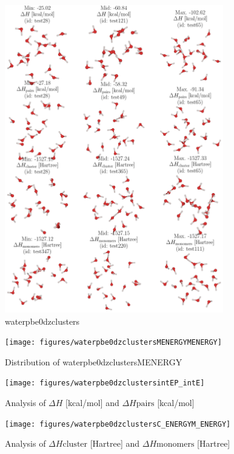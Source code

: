 \documentclass[journal=jacsat,manuscript=article]{achemso}
\begin{document}
\begin{figure}
    \centering
    \includegraphics[width=0.85\textwidth]{figures/waterpbe0dzclustersmols}
    \caption{ waterpbe0dzclusters }
    \label{fig:waterpbe0dzclustersmols}
\end{figure}

\begin{figure}
    \centering
    \texttt{[image: figures/waterpbe0dzclustersMENERGYMENERGY]}
    \caption{ Distribution of waterpbe0dzclustersMENERGY }
    \label{fig:waterpbe0dzclusterssinglekey}
\end{figure}

\begin{figure}
    \centering
    \texttt{[image: figures/waterpbe0dzclustersintEP\_intE]}
    \caption{ Analysis of $\Delta H$ [kcal/mol] and $\Delta H{\mathrm{pairs}}$ [kcal/mol] }
    \label{fig:waterpbe0dzclusters_intE_P_intE}
\end{figure}

\begin{figure}
    \centering
    \texttt{[image: figures/waterpbe0dzclustersC\_ENERGYM\_ENERGY]}
    \caption{ Analysis of $\Delta H{\mathrm{cluster}}$ [Hartree] and $\Delta H{\mathrm{monomers}}$ [Hartree] }
    \label{fig:waterpbe0dzclusters_C_ENERGY_M_ENERGY}
\end{figure}
\newpage 
\end{document}
